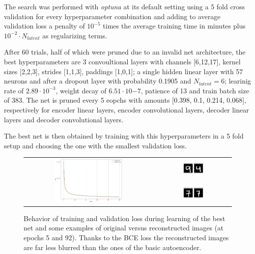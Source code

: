 \documentclass[a4paper, 11pt]{article}
\begin{document}
    The search was performed with \emph{optuna} at its default setting using a 5 fold cross validation for every hyperparameter combination and adding to average validation loss a penalty of $10^{-5}$ times the average training time in minutes plus $10^{-2} \cdot N_{latent}$ as regularizing terms.

    After 60 trials, half of which were pruned due to an invalid net architecture, the best hyperparameters are 3 convoultional layers with channels [6,12,17], kernel sizes [2,2,3], strides [1,1,3], paddings [1,0,1]; a single hidden linear layer with 57 neurons and after a dropout layer with probability 0.1905 and $N_{latent} = 6$; learinig rate of $2.89\cdot10^{-3}$, weight decay of $6.51\cdot10{-7}$, patience of 13 and train batch size of 383. The net is pruned every 5 eopchs with amounts [0.398, 0.1, 0.214, 0.068], respectively for encoder linear layers, encoder convolutional layers, decoder linear layers and decoder convolutional layers.

    The best net is then obtained by training with this hyperparameters in a 5 fold setup and choosing the one with the smallest validation loss.

    \begin{figure}
      \centering
      \begin{tabular}{cc}
        \multirow{2}{*}[2.4cm]{\includegraphics[width=0.55\textwidth]{img/best_loss.png}}
        & \includegraphics[width=0.3\textwidth]{img/best/epoch_5.png} \\
        & \includegraphics[width=0.3\textwidth]{img/best/epoch_92.png} \\
      \end{tabular}
      \caption{Behavior of training and validation loss during learning of the best net and some examples of original versus reconstructed images (at epochs 5 and 92). Thanks to the BCE loss the reconstructed images are far less blurred than the ones of the basic autoencoder.}
      \label{fig:best}
    \end{figure}
\end{document}
